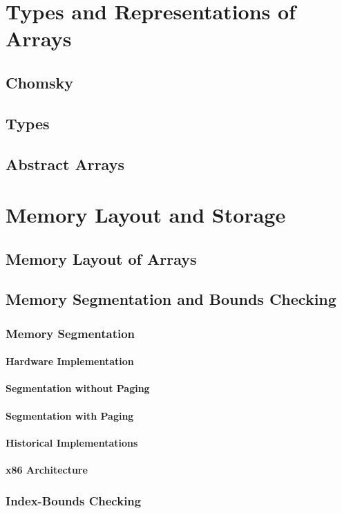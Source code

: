 \documentclass[12pt, oneside]{book}
\begin{document}
\chapter{Types and Representations of Arrays}
\section{Chomsky}
\section{Types}
\section{Abstract Arrays}
\chapter{Memory Layout and Storage}
\section{Memory Layout of Arrays}
\section{Memory Segmentation and Bounds Checking}
\subsection{Memory Segmentation}
\subsubsection{Hardware Implementation}
\subsubsection{Segmentation without Paging}
\subsubsection{Segmentation with Paging}
\subsubsection{Historical Implementations}
\subsubsection{x86 Architecture}
\subsection{Index-Bounds Checking}
\end{document}

